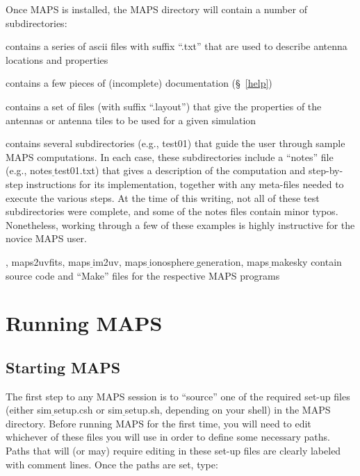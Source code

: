 \documentclass[12pt,psfig]{article}
\begin{document}
Once MAPS is installed, the {\sf MAPS} directory will contain a number of
subdirectories:

\bigskip

 contains a series of ascii files with suffix
``.txt'' that are used to describe antenna locations and properties

\bigskip

 contains a few pieces of (incomplete)
documentation (\S~\ref{help})

\bigskip

 contains a set of files (with suffix
``.layout'') that give the properties of the antennas or antenna tiles
to be used for a given simulation 

\bigskip

 contains several subdirectories (e.g., 
{\sf test01}) that guide the user through sample MAPS
computations. In each case, these subdirectories include a ``notes'' file 
(e.g., notes$\underline~$test01.txt) that gives a description of the
computation and step-by-step instructions for its implementation, together with any meta-files
needed to execute the various steps. At the time of this writing, not
all of these test subdirectories were complete, and some of the
notes files contain minor typos. Nonetheless, working through 
a few of these examples is highly instructive 
for the novice MAPS
user.

\bigskip

, {\sf maps2uvfits}, {\sf maps$\underline~$im2uv}, {\sf
  maps$\underline~$ionosphere$\underline~$generation}, 
{\sf maps$\underline~$makesky} contain source code
  and ``Make'' files for the respective MAPS programs

\section{Running MAPS}
%
\subsection{Starting MAPS}
%
The first step to any MAPS session 
is to ``source'' one of the required
set-up files (either {\sf sim$\underline~$setup.csh} or 
{\sf sim$\underline~$setup.sh}, depending on your shell) in the
{\sf MAPS} directory. Before running MAPS for the first time, 
you will need to edit whichever of these files
you will use in order to define some necessary paths. Paths that
will (or may) require editing in these set-up files 
are clearly labeled with comment lines. Once the paths are set, type:
\end{document}
